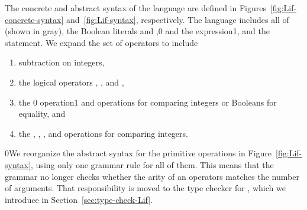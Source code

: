 \documentclass[7x10,nocrop]{TimesAPriori_MIT}%
\def\racketEd{0}
\def\pythonEd{1}
\def\edition{1}
\newcommand{\racket}[1]{{\if\edition\racketEd{#1}\fi}}
\newcommand{\python}[1]{{\if\edition\pythonEd #1\fi}}
\begin{document}
The concrete and abstract syntax of the \LangIf{} language are defined in
Figures~\ref{fig:Lif-concrete-syntax} and~\ref{fig:Lif-syntax},
respectively. The \LangIf{} language includes all of 
\LangVar{} {(shown in gray)}, the Boolean literals \TRUE{} and
\FALSE{},\racket{ and} the  expression\python{, and the
  \code{if}  statement}. We expand the set of operators to include
\begin{enumerate}
\item subtraction on integers,
\item the logical operators , , and ,
\item the \racket{ operation}\python{\key{==} and \key{!=} operations}
  for comparing integers or Booleans for equality, and
\item the \key{<}, \key{<=}, \key{>}, and \key{>=} operations for
  comparing integers.
\end{enumerate}

\racket{We reorganize the abstract syntax for the primitive
  operations in Figure~\ref{fig:Lif-syntax}, using only one grammar
  rule for all of them. This means that the grammar no longer checks
  whether the arity of an operators matches the number of
  arguments. That responsibility is moved to the type checker for
  \LangIf{}, which we introduce in Section~\ref{sec:type-check-Lif}.}


\newcommand{\LifGrammarRacket}{
  \begin{array}{lcl}
   \Type &::=& \key{Boolean} \\
    \itm{bool} &::=& \TRUE \MID \FALSE \\  
    \itm{cmp} &::= & \key{eq?} \MID \key{<} \MID \key{<=} \MID \key{>} \MID \key{>=} \\
    \Exp &::=& \CSUB{\Exp}{\Exp} \MID \itm{bool}
        \MID (\key{and}\;\Exp\;\Exp) \MID (\key{or}\;\Exp\;\Exp)
        \MID (\key{not}\;\Exp) \\
        &\MID& (\itm{cmp}\;\Exp\;\Exp) \MID \CIF{\Exp}{\Exp}{\Exp} 
  \end{array}
}
\newcommand{\LifASTRacket}{
\begin{array}{lcl}
   \Type &::=& \key{Boolean} \\
  \itm{bool} &::=& \code{\#t} \MID \code{\#f} \\
  \itm{cmp} &::= & \code{eq?} \MID \code{<} \MID \code{<=} \MID \code{>} \MID \code{>=} \\
  \itm{op} &::= & \itm{cmp} \MID \code{and} \MID \code{or} \MID \code{not} \\
  \Exp &::=& \BOOL{\itm{bool}} \MID \IF{\Exp}{\Exp}{\Exp} 
\end{array}
}
\newcommand{\LintOpAST}{
  \begin{array}{rcl}
    \itm{op} &::= & \code{read} \MID \code{+} \MID \code{-}\\
    \Exp{} &::=& \INT{\Int} \MID \PRIM{\itm{op}}{\Exp\ldots}    
  \end{array}
}
\end{document}
